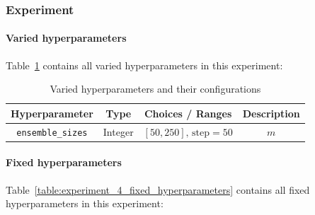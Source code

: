 \documentclass{article}
\begin{document}
\subsubsection{Experiment}
\paragraph{Varied hyperparameters}
Table~\ref{table:experiment_4_varied_hyperparameters} contains all varied hyperparameters in this experiment: 

\begin{table}[H]
    \centering
    \begin{tabular}{|c|c|c|c|}
        \hline
        Hyperparameter & Type & Choices / Ranges & Description \\
        \hline
        \small\texttt{ensemble\_sizes} & Integer & $[50, 250]\text{, step}=50$ & $m$ \\
        \hline
    \end{tabular}
    \caption{Varied hyperparameters and their configurations}
    \label{table:experiment_4_varied_hyperparameters}
\end{table}

\paragraph{Fixed hyperparameters}
Table~\ref{table:experiment_4_fixed_hyperparameters} contains all fixed hyperparameters in this experiment: 
\end{document}
